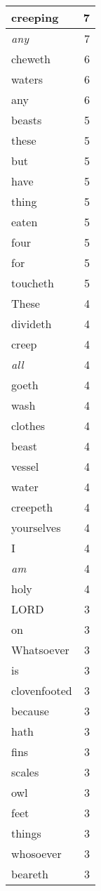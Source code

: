 \begin{center}
\begin{longtable}{l|r}
creeping & 7 \\ \hline
\emph{any} & 7 \\ \hline
cheweth & 6 \\ \hline
waters & 6 \\ \hline
any & 6 \\ \hline
beasts & 5 \\ \hline
these & 5 \\ \hline
but & 5 \\ \hline
have & 5 \\ \hline
thing & 5 \\ \hline
eaten & 5 \\ \hline
four & 5 \\ \hline
for & 5 \\ \hline
toucheth & 5 \\ \hline
These & 4 \\ \hline
divideth & 4 \\ \hline
creep & 4 \\ \hline
\emph{all} & 4 \\ \hline
goeth & 4 \\ \hline
wash & 4 \\ \hline
clothes & 4 \\ \hline
beast & 4 \\ \hline
vessel & 4 \\ \hline
water & 4 \\ \hline
creepeth & 4 \\ \hline
yourselves & 4 \\ \hline
I & 4 \\ \hline
\emph{am} & 4 \\ \hline
holy & 4 \\ \hline
LORD & 3 \\ \hline
on & 3 \\ \hline
Whatsoever & 3 \\ \hline
is & 3 \\ \hline
clovenfooted & 3 \\ \hline
because & 3 \\ \hline
hath & 3 \\ \hline
fins & 3 \\ \hline
scales & 3 \\ \hline
owl & 3 \\ \hline
feet & 3 \\ \hline
things & 3 \\ \hline
whosoever & 3 \\ \hline
beareth & 3 \\ \hline

\end{longtable}
\end{center}
